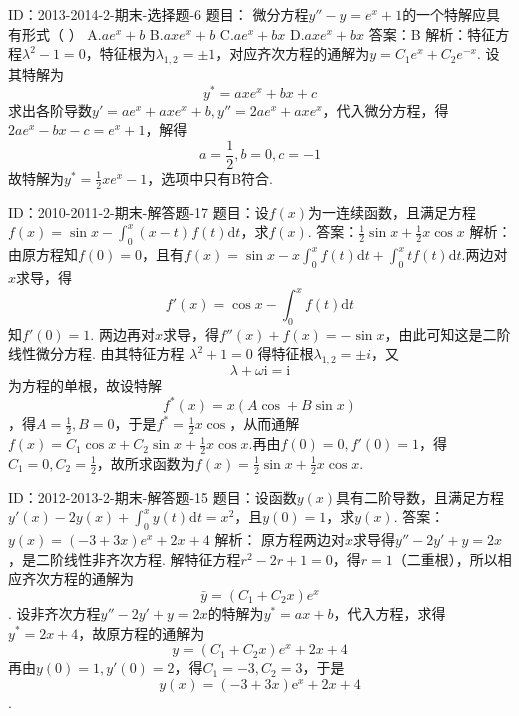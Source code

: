 ID：2013-2014-2-期末-选择题-6
题目：
微分方程${y}''-y={{e}^{x}}+1$的一个特解应具有形式（    ）
A.$a{{e}^{x}}+b$
B.$ax{{e}^{x}}+b$
C.$a{{e}^{x}}+bx$
D.$ax{{e}^{x}}+bx$
答案：B
解析：特征方程${{\lambda }^{2}}-1=0$，特征根为${{\lambda }_{1,2}}=\pm 1$，对应齐次方程的通解为$y={{C}_{1}}{{e}^{x}}+{{C}_{2}}{{e}^{-x}}$. 设其特解为
	\[{{y}^{*}}=ax{{e}^{x}}+bx+c\] 
求出各阶导数${y}'=a{{e}^{x}}+ax{{e}^{x}}+b,{y}''=2a{{e}^{x}}+ax{{e}^{x}}$，代入微分方程，得$2a{{e}^{x}}-bx-c={{e}^{x}}+1$，解得
	\[a=\frac{1}{2},b=0,c=-1\] 
故特解为${{y}^{*}}=\frac{1}{2}x{{e}^{x}}-1$，选项中只有B符合.

ID：2010-2011-2-期末-解答题-17
题目：设$f\left( x \right)$为一连续函数，且满足方程$f\left( x \right)=\sin x-\int_{0}^{x}{\left( x-t \right)f\left( t \right)\text{d}t}$，求$f\left( x \right)$.
答案：$\frac{1}{2}\sin x+\frac{1}{2}x\cos x$
解析：由原方程知$f\left( 0 \right)=0$，且有$f\left( x \right)=\sin x-x\int_{0}^{x}{f\left( t \right)\text{d}t}+\int_{0}^{x}{tf\left( t \right)\text{d}t}$.两边对$x$求导，得
	\[{f}'\left( x \right)=\cos x-\int_{0}^{x}{f\left( t \right)\text{d}t}\] 
知${f}'\left( 0 \right)=1$. 两边再对$x$求导，得${f}''\left( x \right)+f\left( x \right)=-\sin x$，由此可知这是二阶线性微分方程. 由其特征方程
	${{\lambda }^{2}}+1=0$ 
得特征根${{\lambda }_{1,2}}=\pm i$，又\[\lambda +\omega \text{i}=\text{i}\]为方程的单根，故设特解\[{{f}^{*}}\left( x \right)=x\left( A\cos +B\sin x \right)\]，得$A=\frac{1}{2},B=0$，于是${{f}^{*}}=\frac{1}{2}x\cos $，从而通解$f\left( x \right)={{C}_{1}}\cos x+{{C}_{2}}\sin x+\frac{1}{2}x\cos x$.再由$f\left( 0 \right)=0,{f}'\left( 0 \right)=1$，得${{C}_{1}}=0,{{C}_{2}}=\frac{1}{2}$，故所求函数为$f\left( x \right)=\frac{1}{2}\sin x+\frac{1}{2}x\cos x$.

ID：2012-2013-2-期末-解答题-15
题目：设函数$y\left( x \right)$具有二阶导数，且满足方程${y}'\left( x \right)-2y\left( x \right)+\int_{0}^{x}{y\left( t \right)\text{d}t={{x}^{2}}}$，且$y\left( 0 \right)=1$，求$y\left( x \right)$.
答案：$y\left( x \right)=\left( -3+3x \right){{e}^{x}}+2x+4$
解析：
原方程两边对$x$求导得${y}''-2{y}'+y=2x$，是二阶线性非齐次方程. 解特征方程${{r}^{2}}-2r+1=0$，得$r=1$（二重根），所以相应齐次方程的通解为\[\bar{y}=\left( {{C}_{1}}+{{C}_{2}}x \right){{e}^{x}}\]. 
设非齐次方程${y}''-2{y}'+y=2x$的特解为${{y}^{*}}=ax+b$，代入方程，求得${{y}^{*}}=2x+4$，故原方程的通解为
	\[y=\left( {{C}_{1}}+{{C}_{2}}x \right){{e}^{x}}+2x+4\] 
再由$y\left( 0 \right)=1,{y}'\left( 0 \right)=2$，得${{C}_{1}}=-3,{{C}_{2}}=3$，于是\[y\left( x \right)=\left( -3+3x \right){{\text{e}}^{x}}+2x+4\].

